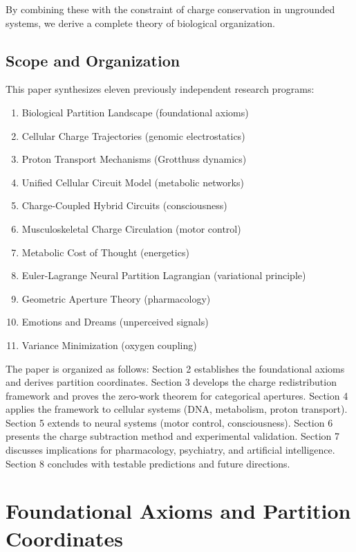 \documentclass[12pt,a4paper]{article}
\begin{document}
By combining these with the constraint of charge conservation in ungrounded systems, we derive a complete theory of biological organization.

\subsection{Scope and Organization}

This paper synthesizes eleven previously independent research programs:
\begin{enumerate}
\item Biological Partition Landscape (foundational axioms)
\item Cellular Charge Trajectories (genomic electrostatics)
\item Proton Transport Mechanisms (Grotthuss dynamics)
\item Unified Cellular Circuit Model (metabolic networks)
\item Charge-Coupled Hybrid Circuits (consciousness)
\item Musculoskeletal Charge Circulation (motor control)
\item Metabolic Cost of Thought (energetics)
\item Euler-Lagrange Neural Partition Lagrangian (variational principle)
\item Geometric Aperture Theory (pharmacology)
\item Emotions and Dreams (unperceived signals)
\item Variance Minimization (oxygen coupling)
\end{enumerate}

The paper is organized as follows: Section 2 establishes the foundational axioms and derives partition coordinates. Section 3 develops the charge redistribution framework and proves the zero-work theorem for categorical apertures. Section 4 applies the framework to cellular systems (DNA, metabolism, proton transport). Section 5 extends to neural systems (motor control, consciousness). Section 6 presents the charge subtraction method and experimental validation. Section 7 discusses implications for pharmacology, psychiatry, and artificial intelligence. Section 8 concludes with testable predictions and future directions.

\section{Foundational Axioms and Partition Coordinates}
\end{document}
